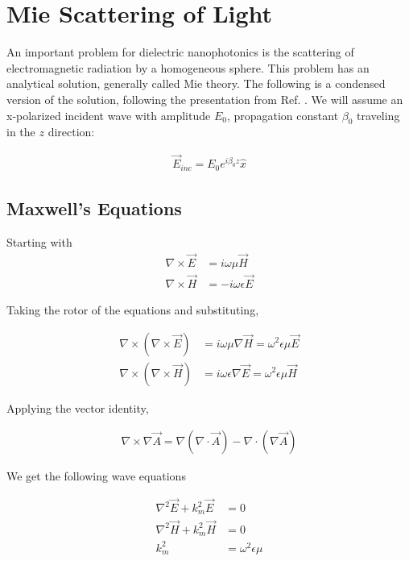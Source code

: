 \section{Mie Scattering of Light}
\label{ap:Mie}
    An important problem for dielectric nanophotonics is the scattering of electromagnetic radiation by
    a homogeneous sphere. This problem has an analytical solution, generally called Mie theory\cite{mie1908beitrage}. The following
    is a condensed version of the solution, following the presentation from Ref. \cite{ng2000manipulation}.
    We will assume an x-polarized incident wave with amplitude $E_0$, propagation constant $\beta_0$ traveling in the $z$ direction:

    \begin{align}
        \vec{E}_{inc} = E_0 e^{i\beta_0z}\hat{x}
    \end{align}

    \subsection{Maxwell's Equations}
        Starting with
        \begin{align}
            \nabla \times \vec{E} &= i\omega\mu\vec{H} \\
            \nabla \times \vec{H} &= -i\omega\epsilon\vec{E}
        \end{align}

        Taking the rotor of the equations and substituting,

        \begin{align}
            \nabla \times (\nabla \times \vec{E}) &= i\omega\mu \nabla \vec{H} = \omega^2 \epsilon\mu\vec{E} \\
            \nabla \times (\nabla \times \vec{H}) &= i\omega\epsilon \nabla \vec{E} = \omega^2 \epsilon\mu\vec{H}
        \end{align}

        Applying the vector identity,

        \begin{align}
            \nabla \times \nabla \vec{A} = \nabla (\nabla \cdot \vec{A}) - \nabla \cdot (\nabla\vec{A})
        \end{align}

        We get the following wave equations

        \begin{align}
            \nabla^2\vec{E} + k^2_m\vec{E} &= 0 \label{mie:waveE}\\
            \nabla^2\vec{H} + k^2_m\vec{H} &= 0 \label{mie:waveH}\\
            k^2_m &= \omega^2\epsilon\mu \label{mie:kvec}
        \end{align}

